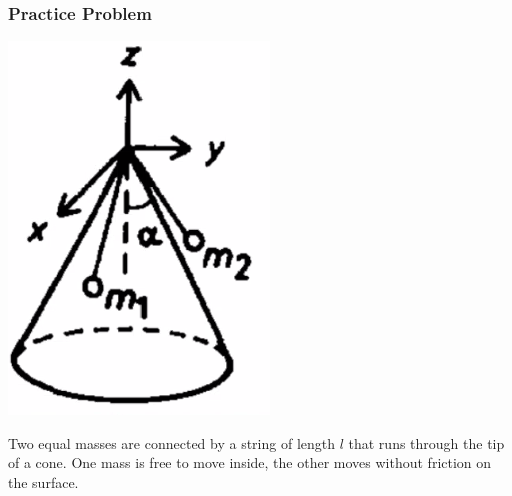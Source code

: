 \documentclass[../PHYS306Notes.tex]{subfiles}
\begin{document}
\subsubsection{Practice Problem}
\begin{center}
    \includegraphics[scale=0.5]{Lecture-35/l35-img1.png}
\end{center}
Two equal masses are connected by a string of length $l$ that runs through the tip of a cone. One mass is free to move inside, the other moves without friction on the surface. 
\end{document}
